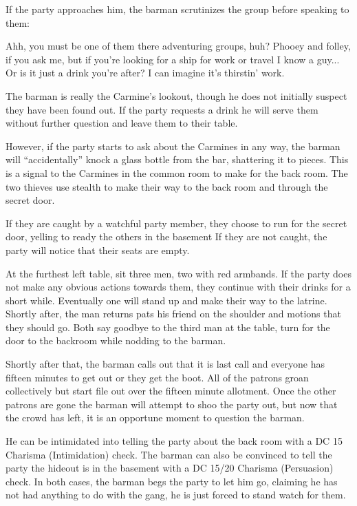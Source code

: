 \documentclass[10pt,twocolumn,openany,nodeprecatedcode,bg=none,inline]{dndbook}
\begin{document}
If the party approaches him, the barman scrutinizes the group before speaking to them:

\begin{DndReadAloud}
  Ahh, you must be one of them there adventuring groups, huh?
  Phooey and folley, if you ask me, but if you're looking for a ship for work or travel I know a guy...
  Or is it just a drink you're after?
  I can imagine it's thirstin' work.
\end{DndReadAloud}

The barman is really the Carmine's lookout, though he does not initially suspect they have been found out.
If the party requests a drink he will serve them without further question and leave them to their table.

However, if the party starts to ask about the Carmines in any way, the barman will ``accidentally'' knock a glass bottle from the bar, shattering it to pieces.
This is a signal to the Carmines in the common room to make for the back room.
The two thieves use stealth to make their way to the back room and through the secret door.

If they are caught by a watchful party member, they choose to run for the secret door, yelling to ready the others in the basement
If they are not caught, the party will notice that their seats are empty.

At the furthest left table, sit three men, two with red armbands.
If the party does not make any obvious actions towards them, they continue with their drinks for a short while.
Eventually one will stand up and make their way to the latrine.
Shortly after, the man returns pats his friend on the shoulder and motions that they should go.
Both say goodbye to the third man at the table, turn for the door to the backroom while nodding to the barman.

Shortly after that, the barman calls out that it is last call and everyone has fifteen minutes to get out or they get the boot.
All of the patrons groan collectively but start file out over the fifteen minute allotment.
Once the other patrons are gone the barman will attempt to shoo the party out, but now that the crowd has left, it is an opportune moment to question the barman.

He can be intimidated into telling the party about the back room with a DC 15 Charisma (Intimidation) check.
The barman can also be convinced to tell the party the hideout is in the basement with a DC 15/20 Charisma (Persuasion) check.
In both cases, the barman begs the party to let him go, claiming he has not had anything to do with the gang, he is just forced to stand watch for them.
\end{document}
